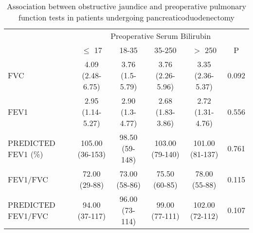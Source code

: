 \begin{sidewaystable}[p]
	\caption{Association between obstructive jaundice and preoperative pulmonary function tests in patients undergoing pancreaticoduodenectomy }
	\label{table:cpet_oj_table3}
	\centering
	\renewcommand{\arraystretch}{1.4} %
	\setlength{\tabcolsep}{9pt} %
	
	\begin{tabular}{l c c c c c}
		                    &                 \multicolumn{5}{c}{Preoperative Serum Bilirubin}                 \\
		                    & $\leq$ 17        & 18-35           & 35-250           & $>$ 250          & P     \\ \hline
		FVC                 & 4.09 (2.48-6.75) & 3.76 (1.5-5.79) & 3.76 (2.26-5.96) & 3.35 (2.36-5.37) & 0.092 \\
		FEV1                & 2.95 (1.14-5.27) & 2.90 (1.3-4.77) & 2.68 (1.83-3.86) & 2.72 (1.31-4.76) & 0.556 \\
		PREDICTED FEV1 (\%) & 105.00 (36-153)  & 98.50 (59-148)  & 103.00 (79-140)  & 101.00 (81-137)  & 0.761 \\
		FEV1/FVC            & 72.00 (29-88)    & 73.00 (58-86)   & 75.50 (60-85)    & 78.00 (55-88)    & 0.115 \\
		PREDICTED FEV1/FVC  & 94.00 (37-117)   & 96.00 (73-114)  & 99.00 (77-111)   & 102.00 (72-112)  & 0.107 \\ \hline
	\end{tabular}
\end{sidewaystable}